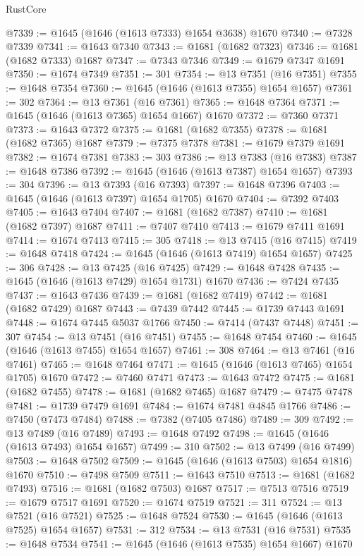 \begin{lexlean}{RustCore}
\begin{coremodule}
@7339 := @1645 (@1646 (@1613 @7333) @1654 @3638) @1670
@7340 := @7328 @7339
@7341 := @1643 @7340
@7343 := @1681 (@1682 @7323)
@7346 := @1681 (@1682 @7333) @1687
@7347 := @7343 @7346
@7349 := @1679 @7347 @1691
@7350 := @1674 @7349
@7351 := 301
@7354 := @13 @7351 (@16 @7351)
@7355 := @1648 @7354
@7360 := @1645 (@1646 (@1613 @7355) @1654 @1657)
@7361 := 302
@7364 := @13 @7361 (@16 @7361)
@7365 := @1648 @7364
@7371 := @1645 (@1646 (@1613 @7365) @1654 @1667) @1670
@7372 := @7360 @7371
@7373 := @1643 @7372
@7375 := @1681 (@1682 @7355)
@7378 := @1681 (@1682 @7365) @1687
@7379 := @7375 @7378
@7381 := @1679 @7379 @1691
@7382 := @1674 @7381
@7383 := 303
@7386 := @13 @7383 (@16 @7383)
@7387 := @1648 @7386
@7392 := @1645 (@1646 (@1613 @7387) @1654 @1657)
@7393 := 304
@7396 := @13 @7393 (@16 @7393)
@7397 := @1648 @7396
@7403 := @1645 (@1646 (@1613 @7397) @1654 @1705) @1670
@7404 := @7392 @7403
@7405 := @1643 @7404
@7407 := @1681 (@1682 @7387)
@7410 := @1681 (@1682 @7397) @1687
@7411 := @7407 @7410
@7413 := @1679 @7411 @1691
@7414 := @1674 @7413
@7415 := 305
@7418 := @13 @7415 (@16 @7415)
@7419 := @1648 @7418
@7424 := @1645 (@1646 (@1613 @7419) @1654 @1657)
@7425 := 306
@7428 := @13 @7425 (@16 @7425)
@7429 := @1648 @7428
@7435 := @1645 (@1646 (@1613 @7429) @1654 @1731) @1670
@7436 := @7424 @7435
@7437 := @1643 @7436
@7439 := @1681 (@1682 @7419)
@7442 := @1681 (@1682 @7429) @1687
@7443 := @7439 @7442
@7445 := @1739 @7443 @1691
@7448 := @1674 @7445 @5037 @1766
@7450 := @7414 (@7437 @7448)
@7451 := 307
@7454 := @13 @7451 (@16 @7451)
@7455 := @1648 @7454
@7460 := @1645 (@1646 (@1613 @7455) @1654 @1657)
@7461 := 308
@7464 := @13 @7461 (@16 @7461)
@7465 := @1648 @7464
@7471 := @1645 (@1646 (@1613 @7465) @1654 @1705) @1670
@7472 := @7460 @7471
@7473 := @1643 @7472
@7475 := @1681 (@1682 @7455)
@7478 := @1681 (@1682 @7465) @1687
@7479 := @7475 @7478
@7481 := @1739 @7479 @1691
@7484 := @1674 @7481 @4845 @1766
@7486 := @7450 (@7473 @7484)
@7488 := @7382 (@7405 @7486)
@7489 := 309
@7492 := @13 @7489 (@16 @7489)
@7493 := @1648 @7492
@7498 := @1645 (@1646 (@1613 @7493) @1654 @1657)
@7499 := 310
@7502 := @13 @7499 (@16 @7499)
@7503 := @1648 @7502
@7509 := @1645 (@1646 (@1613 @7503) @1654 @1816) @1670
@7510 := @7498 @7509
@7511 := @1643 @7510
@7513 := @1681 (@1682 @7493)
@7516 := @1681 (@1682 @7503) @1687
@7517 := @7513 @7516
@7519 := @1679 @7517 @1691
@7520 := @1674 @7519
@7521 := 311
@7524 := @13 @7521 (@16 @7521)
@7525 := @1648 @7524
@7530 := @1645 (@1646 (@1613 @7525) @1654 @1657)
@7531 := 312
@7534 := @13 @7531 (@16 @7531)
@7535 := @1648 @7534
@7541 := @1645 (@1646 (@1613 @7535) @1654 @1667) @1670

\end{coremodule}
\end{lexlean}
